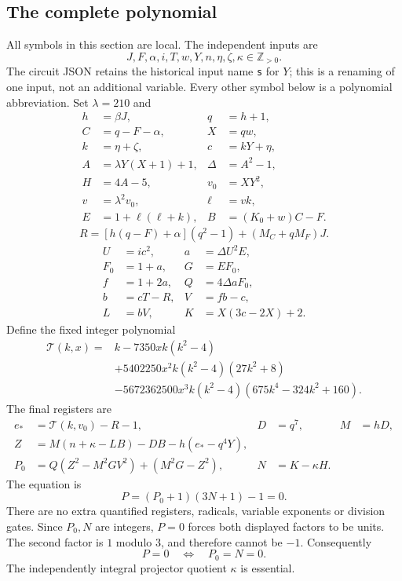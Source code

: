 \subsection{The complete polynomial}
All symbols in this section are local. The independent inputs are
\[
 J,F,\alpha,i,T,w,Y,n,\eta,\zeta,\kappa\in\mathbb Z_{>0}.
\]
The circuit JSON retains the historical input name \texttt{s} for $Y$;
this is a renaming of one input, not an additional variable.
Every other symbol below is a polynomial abbreviation. Set $\lambda=210$ and
\begin{align*}
 h&=\beta J,& q&=h+1,\\
 C&=q-F-\alpha,&X&=qw,\\
 k&=\eta+\zeta,&c&=kY+\eta,\\
 A&=\lambda Y(X+1)+1,&\Delta&=A^2-1,\\
 H&=4A-5,&v_0&=XY^2,\\
 v&=\lambda^2v_0,&\ell&=vk,\\
 E&=1+\ell(\ell+k),&B&=(K_0+w)C-F.
\end{align*}
\[
 R=[h(q-F)+\alpha](q^2-1)+(M_C+qM_F)J.
\]
\begin{align*}
 U&=ic^2,&a&=\Delta U^2E,\\
 F_0&=1+a,&G&=EF_0,\\
 f&=1+2a,&Q&=4\Delta aF_0,\\
 b&=cT-R,&V&=fb-c,\\
 L&=bV,&K&=X(3c-2X)+2.
\end{align*}
Define the fixed integer polynomial
\begin{align*}
 \mathcal T(k,x)={}&k-7350xk(k^2-4)\\
 &+5402250x^2k(k^2-4)(27k^2+8)\\
 &-5672362500x^3k(k^2-4)(675k^4-324k^2+160).
\end{align*}
The final registers are
\begin{align*}
 e_*&=\mathcal T(k,v_0)-R-1,&D&=q^7,&M&=hD,\\
 Z&=M(n+\kappa-LB)-DB-h(e_*-q^4Y),\\
 P_0&=Q(Z^2-M^2GV^2)+(M^2G-Z^2),&N&=K-\kappa H.
\end{align*}
The equation is
\[
 \boxed{\quad P=(P_0+1)(3N+1)-1=0.\quad}
\]
There are no extra quantified registers, radicals, variable exponents or
division gates. Since $P_0,N$ are integers, $P=0$ forces both displayed
factors to be units. The second factor is $1$ modulo $3$, and therefore
cannot be $-1$. Consequently
\[
 P=0\quad\Longleftrightarrow\quad P_0=N=0.
\]
The independently integral projector quotient $\kappa$ is essential.

